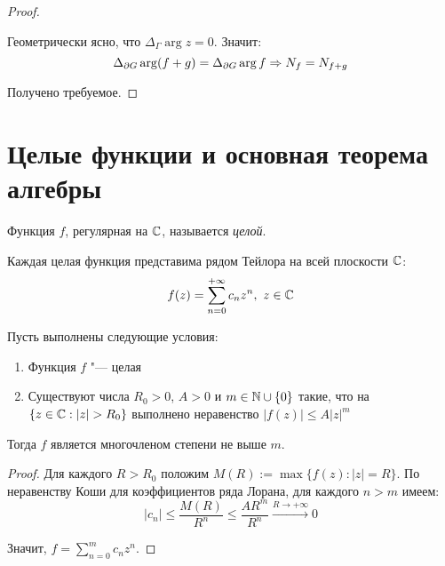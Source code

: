 \begin{proof}
\begin{center}
	\end{center}
	
	Геометрически ясно, что $\Delta_\Gamma\arg{z} = 0$. Значит:
	\[\Delta_{\partial G}\arg (f+g) = \Delta_{\partial G}\arg f \Rightarrow N_f = N_{f+g}\]
	
	Получено требуемое.
\end{proof}

\section{Целые функции и основная теорема алгебры}

\begin{definition}
	Функция $f$, регулярная на $\mathbb{C}$, называется \textit{целой}.
\end{definition}

\begin{note}
	Каждая целая функция представима рядом Тейлора на всей плоскости $\mathbb{C}$:
	\[f(z) = \sum_{n=0}^{+\infty}c_nz^n,~z \in \mathbb{C}\]
\end{note}

\begin{proposition}
	Пусть выполнены следующие условия:
	\begin{enumerate}
		\item Функция $f$ "--- целая
		\item Существуют числа $R_0 > 0$, $A > 0$ и $m \in \mathbb{N} \cup \{0\}$ такие, что на $\{z \in \mathbb{C}: |z| > R_0\}$ выполнено неравенство $|f(z)| \le A|z|^m$
	\end{enumerate}
	
	Тогда $f$ является многочленом степени не выше $m$.
\end{proposition}

\begin{proof}
	Для каждого $R > R_0$ положим $M(R) := \max\{f(z): |z| = R\}$. По неравенству Коши для коэффициентов ряда Лорана, для каждого $n >m $ имеем:
	\[|c_n| \le \frac{M(R)}{R^n} \le \frac{AR^m}{R^n} \xrightarrow{R \to +\infty} 0\]
	
	Значит, $f = \sum_{n = 0}^mc_nz^n$.
\end{proof}

